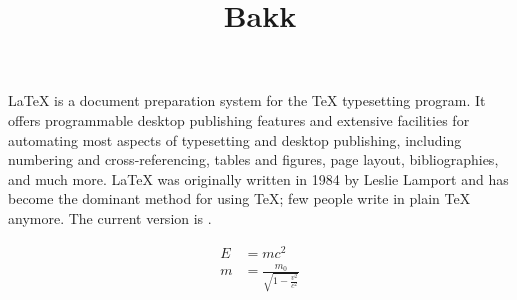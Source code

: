 \documentclass[12pt]{article}
\title{Bakk}
\date{}
\begin{document}
	\maketitle
	\LaTeX{} is a document preparation system for the \TeX{}
	typesetting program. It offers programmable desktop publishing
	features and extensive facilities for automating most aspects of
	typesetting and desktop publishing, including numbering and
	cross-referencing, tables and figures, page layout, bibliographies,
	and much more. \LaTeX{} was originally written in 1984 by Leslie
	Lamport and has become the dominant method for using \TeX; few
	people write in plain \TeX{} anymore. The current version  is
	\LaTeXe.
 
	\begin{align}
    	E &= mc^2                              \\
    	m &= \frac{m_0}{\sqrt{1-\frac{v^2}{c^2}}}
	\end{align}
\end{document}
